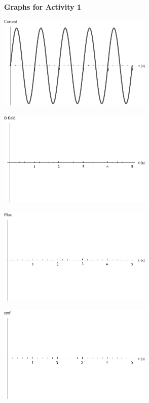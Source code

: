 \begin{center}

{\bf Graphs for Activity 1}

\vfil

\includegraphics[width=2.9in]{induction2/indfig1_bw.eps}

\includegraphics[width=2.9in]{induction2/indfig2.eps}

\includegraphics[width=2.9in]{induction2/indfig3.eps}

\includegraphics[width=2.9in]{induction2/indfig4.eps}



\vfil

\end{center}


